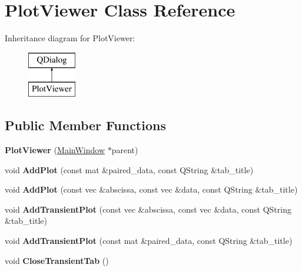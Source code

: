 \hypertarget{class_plot_viewer}{}\section{Plot\+Viewer Class Reference}
\label{class_plot_viewer}
Inheritance diagram for Plot\+Viewer\+:\begin{figure}[H]
\begin{center}
\leavevmode
\includegraphics[height=2.000000cm]{class_plot_viewer}
\end{center}
\end{figure}
\subsection*{Public Member Functions}
\begin{DoxyCompactItemize}
\item 
{\bfseries Plot\+Viewer} (\hyperlink{class_main_window}{Main\+Window} $\ast$parent)\hypertarget{class_plot_viewer_adc540b3871c36fbed0a67f8c934b49d1}{}\label{class_plot_viewer_adc540b3871c36fbed0a67f8c934b49d1}

\item 
void {\bfseries Add\+Plot} (const mat \&paired\+\_\+data, const Q\+String \&tab\+\_\+title)\hypertarget{class_plot_viewer_ada2f4a2e28e5719f4d5e4542b329343a}{}\label{class_plot_viewer_ada2f4a2e28e5719f4d5e4542b329343a}

\item 
void {\bfseries Add\+Plot} (const vec \&abscissa, const vec \&data, const Q\+String \&tab\+\_\+title)\hypertarget{class_plot_viewer_af85af3543930f48729fa74a32d35e85f}{}\label{class_plot_viewer_af85af3543930f48729fa74a32d35e85f}

\item 
void {\bfseries Add\+Transient\+Plot} (const vec \&abscissa, const vec \&data, const Q\+String \&tab\+\_\+title)\hypertarget{class_plot_viewer_aed3c245cc5ddfde9856e1e52642e4208}{}\label{class_plot_viewer_aed3c245cc5ddfde9856e1e52642e4208}

\item 
void {\bfseries Add\+Transient\+Plot} (const mat \&paired\+\_\+data, const Q\+String \&tab\+\_\+title)\hypertarget{class_plot_viewer_afb63a55983d1e8a695741509979311da}{}\label{class_plot_viewer_afb63a55983d1e8a695741509979311da}

\item 
void {\bfseries Close\+Transient\+Tab} ()\hypertarget{class_plot_viewer_aad3268b8bb6d095a3820b15c3c75d1c4}{}\label{class_plot_viewer_aad3268b8bb6d095a3820b15c3c75d1c4}

\end{DoxyCompactItemize}


